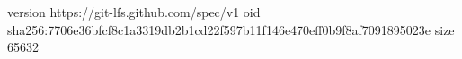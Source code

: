 version https://git-lfs.github.com/spec/v1
oid sha256:7706e36bfcf8c1a3319db2b1cd22f597b11f146e470eff0b9f8af7091895023e
size 65632
